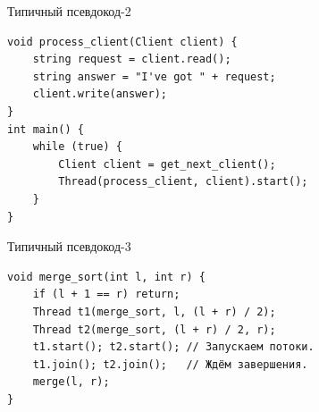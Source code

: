 \begin{frame}[fragile]{Типичный псевдокод-2}
\begin{verbatim}
void process_client(Client client) {
    string request = client.read();
    string answer = "I've got " + request;
    client.write(answer);
}
int main() {
    while (true) {
        Client client = get_next_client();
        Thread(process_client, client).start();
    }
}
\end{verbatim}
\end{frame}

\begin{frame}[fragile]{Типичный псевдокод-3}
\begin{verbatim}
void merge_sort(int l, int r) {
    if (l + 1 == r) return;
    Thread t1(merge_sort, l, (l + r) / 2);
    Thread t2(merge_sort, (l + r) / 2, r);
    t1.start(); t2.start(); // Запускаем потоки.
    t1.join(); t2.join();   // Ждём завершения.
    merge(l, r);
}
\end{verbatim}
\end{frame}
